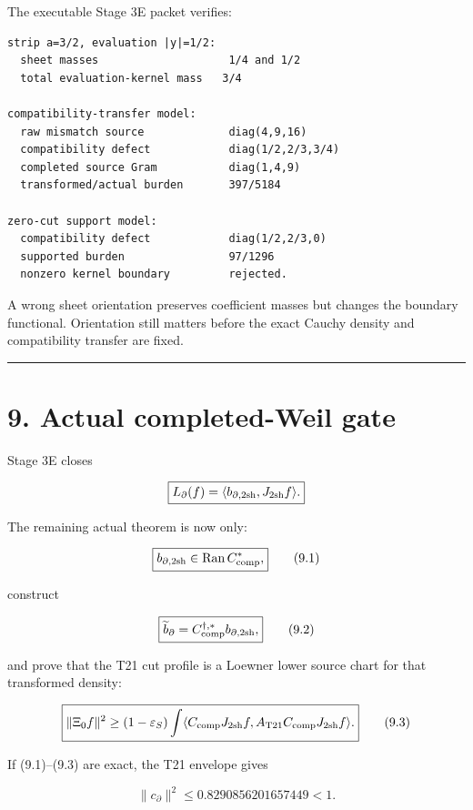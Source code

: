The executable Stage 3E packet verifies:

\begin{verbatim}
strip a=3/2, evaluation |y|=1/2:
  sheet masses                    1/4 and 1/2
  total evaluation-kernel mass   3/4

compatibility-transfer model:
  raw mismatch source             diag(4,9,16)
  compatibility defect            diag(1/2,2/3,3/4)
  completed source Gram           diag(1,4,9)
  transformed/actual burden       397/5184

zero-cut support model:
  compatibility defect            diag(1/2,2/3,0)
  supported burden                97/1296
  nonzero kernel boundary         rejected.
\end{verbatim}

A wrong sheet orientation preserves coefficient masses but changes the boundary
functional. Orientation still matters before the exact Cauchy density and
compatibility transfer are fixed.

\begin{center}\rule{0.5\linewidth}{0.5pt}\end{center}

\hypertarget{actual-completed-weil-gate}{%
\section{9. Actual completed-Weil gate}\label{actual-completed-weil-gate}}

Stage 3E closes

\[
\boxed{
L_\partial(f)
=\langle b_{\partial,{\rm 2sh}},J_{\rm 2sh}f\rangle.
}
\]

The remaining actual theorem is now only:

\[
\boxed{
b_{\partial,{\rm 2sh}}
\in\operatorname{Ran}C_{\rm comp}^*,}
\tag{9.1}
\]

construct

\[
\boxed{
\widetilde b_\partial
=C_{\rm comp}^{\dagger,*}b_{\partial,{\rm 2sh}},}
\tag{9.2}
\]

and prove that the T21 cut profile is a Loewner lower source chart for that
transformed density:

\[
\boxed{
\|\Xi_0f\|^2
\ge
(1-\varepsilon_S)
\int
\langle C_{\rm comp}J_{\rm 2sh}f,
A_{\rm T21}
C_{\rm comp}J_{\rm 2sh}f\rangle.
}
\tag{9.3}
\]

If (9.1)--(9.3) are exact, the T21 envelope gives

\[
\|c_\partial\|^2
\le0.8290856201657449<1.
\]

